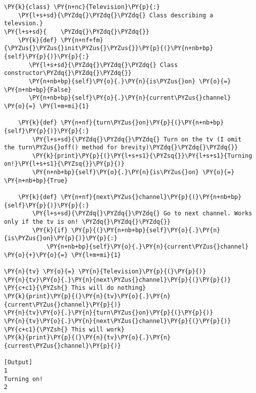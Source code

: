 \begin{Verbatim}[label=\makebox{\url{https://bitbucket.org/lbaldini/programming/src/tip/snippets/class\_tv\_zapping.py}},commandchars=\\\{\}]
\PY{k}{class} \PY{n+nc}{Television}\PY{p}{:}
    \PY{l+s+sd}{\PYZdq{}\PYZdq{}\PYZdq{} Class describing a televsion.}
\PY{l+s+sd}{    \PYZdq{}\PYZdq{}\PYZdq{}}
    \PY{k}{def} \PY{n+nf+fm}{\PYZus{}\PYZus{}init\PYZus{}\PYZus{}}\PY{p}{(}\PY{n+nb+bp}{self}\PY{p}{)}\PY{p}{:}
       \PY{l+s+sd}{\PYZdq{}\PYZdq{}\PYZdq{} Class constructor\PYZdq{}\PYZdq{}\PYZdq{}}
       \PY{n+nb+bp}{self}\PY{o}{.}\PY{n}{is\PYZus{}on} \PY{o}{=} \PY{n+nb+bp}{False}
       \PY{n+nb+bp}{self}\PY{o}{.}\PY{n}{current\PYZus{}channel} \PY{o}{=} \PY{l+m+mi}{1}       
    
    \PY{k}{def} \PY{n+nf}{turn\PYZus{}on}\PY{p}{(}\PY{n+nb+bp}{self}\PY{p}{)}\PY{p}{:}
        \PY{l+s+sd}{\PYZdq{}\PYZdq{}\PYZdq{} Turn on the tv (I omit the turn\PYZus{}off() method for brevity)\PYZdq{}\PYZdq{}\PYZdq{}}
        \PY{k}{print}\PY{p}{(}\PY{l+s+s1}{\PYZsq{}}\PY{l+s+s1}{Turning on!}\PY{l+s+s1}{\PYZsq{}}\PY{p}{)}
        \PY{n+nb+bp}{self}\PY{o}{.}\PY{n}{is\PYZus{}on} \PY{o}{=} \PY{n+nb+bp}{True}

    \PY{k}{def} \PY{n+nf}{next\PYZus{}channel}\PY{p}{(}\PY{n+nb+bp}{self}\PY{p}{)}\PY{p}{:}
        \PY{l+s+sd}{\PYZdq{}\PYZdq{}\PYZdq{} Go to next channel. Works only if the tv is on! \PYZdq{}\PYZdq{}\PYZdq{}}
        \PY{k}{if} \PY{p}{(}\PY{n+nb+bp}{self}\PY{o}{.}\PY{n}{is\PYZus{}on}\PY{p}{)}\PY{p}{:}
            \PY{n+nb+bp}{self}\PY{o}{.}\PY{n}{current\PYZus{}channel} \PY{o}{+}\PY{o}{=} \PY{l+m+mi}{1}

\PY{n}{tv} \PY{o}{=} \PY{n}{Television}\PY{p}{(}\PY{p}{)}
\PY{n}{tv}\PY{o}{.}\PY{n}{next\PYZus{}channel}\PY{p}{(}\PY{p}{)} \PY{c+c1}{\PYZsh{} This will do nothing}
\PY{k}{print}\PY{p}{(}\PY{n}{tv}\PY{o}{.}\PY{n}{current\PYZus{}channel}\PY{p}{)}
\PY{n}{tv}\PY{o}{.}\PY{n}{turn\PYZus{}on}\PY{p}{(}\PY{p}{)}
\PY{n}{tv}\PY{o}{.}\PY{n}{next\PYZus{}channel}\PY{p}{(}\PY{p}{)} \PY{c+c1}{\PYZsh{} This will work}
\PY{k}{print}\PY{p}{(}\PY{n}{tv}\PY{o}{.}\PY{n}{current\PYZus{}channel}\PY{p}{)}

[Output]
1
Turning on!
2
\end{Verbatim}